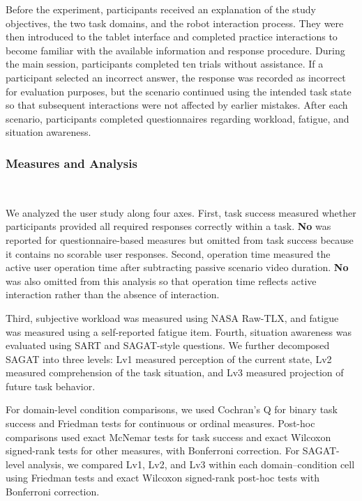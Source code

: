 Before the experiment, participants received an explanation of the study objectives, the two task domains, and the robot interaction process. They were then introduced to the tablet interface and completed practice interactions to become familiar with the available information and response procedure. During the main session, participants completed ten trials without assistance. If a participant selected an incorrect answer, the response was recorded as incorrect for evaluation purposes, but the scenario continued using the intended task state so that subsequent interactions were not affected by earlier mistakes. After each scenario, participants completed questionnaires regarding workload, fatigue, and situation awareness. %

\subsubsection{Measures and Analysis}~\label{user:measures}

We analyzed the user study along four axes. First, task success measured whether participants provided all required responses correctly within a task. \textbf{No} was reported for questionnaire-based measures but omitted from task success because it contains no scorable user responses. Second, operation time measured the active user operation time after subtracting passive scenario video duration. \textbf{No} was also omitted from this analysis so that operation time reflects active interaction rather than the absence of interaction.

Third, subjective workload was measured using NASA Raw-TLX, and fatigue was measured using a self-reported fatigue item. Fourth, situation awareness was evaluated using SART and SAGAT-style questions. We further decomposed SAGAT into three levels: Lv1 measured perception of the current state, Lv2 measured comprehension of the task situation, and Lv3 measured projection of future task behavior.

For domain-level condition comparisons, we used Cochran's Q for binary task success and Friedman tests for continuous or ordinal measures. Post-hoc comparisons used exact McNemar tests for task success and exact Wilcoxon signed-rank tests for other measures, with Bonferroni correction. For SAGAT-level analysis, we compared Lv1, Lv2, and Lv3 within each domain--condition cell using Friedman tests and exact Wilcoxon signed-rank post-hoc tests with Bonferroni correction.

